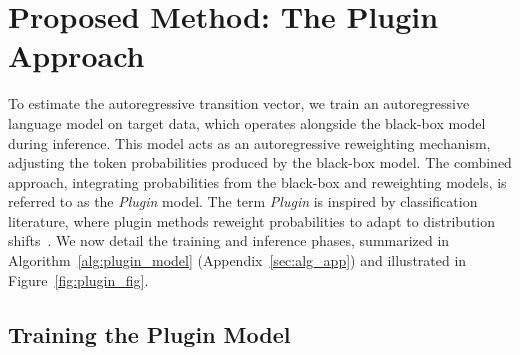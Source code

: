 \section{Proposed Method: The Plugin Approach}
\label{sec:method}


To estimate the autoregressive transition vector, we train an autoregressive language model on target data, which operates alongside the black-box model during inference. This model acts as an autoregressive reweighting mechanism, adjusting the token probabilities produced by the black-box model. The combined approach, integrating probabilities from the black-box and reweighting models, is referred to as the \textit{Plugin} model. The term \textit{Plugin} is inspired by classification literature, where plugin methods reweight probabilities to adapt to distribution shifts~\citep{koyejo2014consistent, narasimhan2014statistical, narasimhan2015consistent, hiranandani2021optimizing}. We now detail the training and inference phases, summarized in Algorithm~\ref{alg:plugin_model} (Appendix~\ref{sec:alg_app}) and illustrated in Figure~\ref{fig:plugin_fig}.


\subsection{Training the Plugin Model}
\label{ssec:training}


